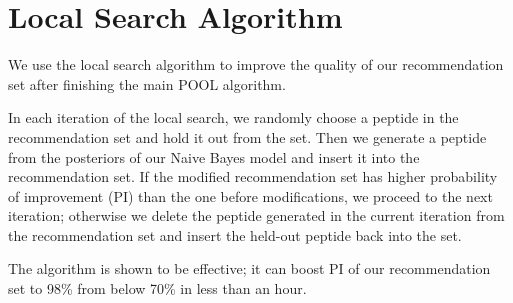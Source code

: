 \section{Local Search Algorithm}
We use the local search algorithm to improve the quality of our recommendation set after finishing the main POOL algorithm.

In each iteration of the local search, we randomly choose a peptide in the recommendation set and hold it out from the set. Then we generate a peptide from the posteriors of our Naive Bayes model and insert it into the recommendation set. If the modified recommendation set has higher probability of improvement (PI) than the one before modifications, we proceed to the next iteration; otherwise we delete the peptide generated in the current iteration from the recommendation set and insert the held-out peptide back into the set.

The algorithm is shown to be effective; it can boost PI of our recommendation set to 98\% from below 70\% in less than an hour. %